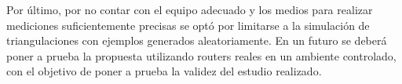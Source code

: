 \documentclass[journal]{IEEEtran}
\begin{document}
Por último, por no contar con el equipo adecuado y los medios para realizar mediciones suficientemente precisas se optó por limitarse a la simulación de triangulaciones con ejemplos generados aleatoriamente. En un futuro se deberá poner a prueba la propuesta utilizando routers reales en un ambiente controlado, con el objetivo de poner a prueba la validez del estudio realizado.\\

\newpage



%
%
%









\end{document}
